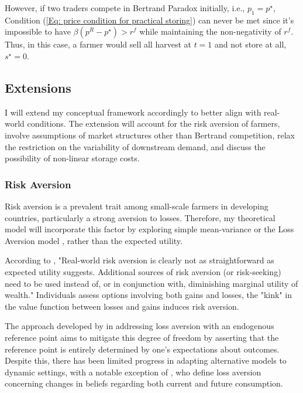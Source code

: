 However, if two traders compete in Bertrand Paradox initially, i.e., $p_1=p^\star$, Condition (\ref{Eq: price condition for practical storing}) can never be met since it's impossible to have $\beta (p^R-p^\star) > r^f$ while maintaining the non-negativity of $r^f$. Thus, in this case, a farmer would sell all harvest at $t=1$ and not store at all, $s^\star=0$. 






\subsection{Extensions}
\noindent I will extend my conceptual framework accordingly to better align with real-world conditions. The extension will account for the risk aversion of farmers, involve assumptions of market structures other than Bertrand competition, relax the restriction on the variability of downstream demand, and discuss the possibility of non-linear storage costs.

\subsubsection{Risk Aversion}
\noindent Risk aversion is a prevalent trait among small-scale farmers in developing countries, particularly a strong aversion to losses. Therefore, my theoretical model will incorporate this factor by exploring simple mean-variance or the Loss Aversion model \citep{kahneman1979prospect}, rather than the expected utility.

According to \cite{o2018modeling}, "Real-world risk aversion is clearly not as straightforward as expected utility suggests. Additional sources of risk aversion (or risk-seeking) need to be used instead of, or in conjunction with, diminishing marginal utility of wealth." Individuals assess options involving both gains and losses, the "kink" in the value function between losses and gains induces risk aversion.


The approach developed by \cite{kHoszegi2006model, kHoszegi2007reference, kHoszegi2009reference} in addressing loss aversion with an endogenous reference point aims to mitigate this degree of freedom by asserting that the reference point is entirely determined by one's expectations about outcomes. Despite this, there has been limited progress in adapting alternative models to dynamic settings, with a notable exception of \cite{kHoszegi2009reference}, who define loss aversion concerning changes in beliefs regarding both current and future consumption.

